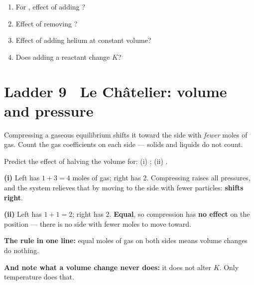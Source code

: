 \documentclass{apchem-worksheet}
\begin{document}
\begin{yourturn}
\begin{enumerate}[leftmargin=*,itemsep=0.5em]
  \item For , effect of adding ?
        \workspace[1.4cm]
  \item Effect of removing ? \workspace[1.4cm]
  \item Effect of adding helium at constant volume?
        \workspace[1.4cm]
  \item Does adding a reactant change $K$? \workspace[1.4cm]
\end{enumerate}
\end{yourturn}

\section*{\sffamily Ladder 9 \textbullet\ Le Ch\^{a}telier: volume and pressure}
 

Compressing a gaseous equilibrium shifts it toward the side with
\emph{fewer} moles of gas. Count the gas coefficients on each side ---
solids and liquids do not count.

\begin{workedexample}
Predict the effect of halving the volume for:
(i) ;
(ii) .

\textbf{(i)} Left has $1 + 3 = 4$ moles of gas; right has 2. Compressing
raises all pressures, and the system relieves that by moving to the side
with fewer particles: \textbf{shifts right}.

\textbf{(ii)} Left has $1 + 1 = 2$; right has 2. \textbf{Equal}, so
compression has \textbf{no effect} on the position --- there is no side
with fewer moles to move toward.

\textbf{The rule in one line:} equal moles of gas on both sides means
volume changes do nothing.

\textbf{And note what a volume change never does:} it does not alter $K$.
Only temperature does that.
\end{workedexample}
\end{document}
